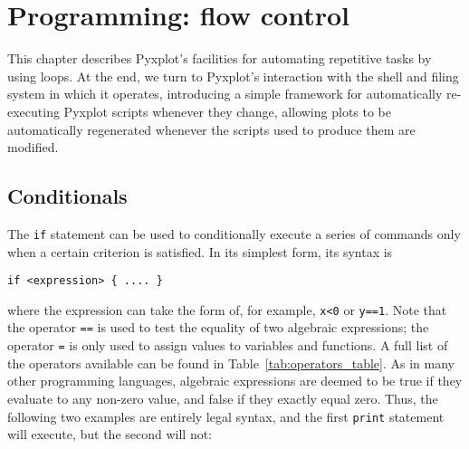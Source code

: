 %
%
%
%
%



\chapter{Programming: flow control}

This chapter describes Pyxplot's facilities for automating
repetitive tasks by using loops. At the end, we turn to Pyxplot's
interaction with the shell and filing system in which it operates, introducing
a simple framework for automatically re-executing Pyxplot scripts whenever they
change, allowing plots to be automatically regenerated whenever the scripts
used to produce them are modified.

\section{Conditionals}

The {\tt if} statement can be used to conditionally execute a series
of commands only when a certain criterion is satisfied. In its simplest form,
its syntax is

\begin{verbatim}
if <expression> { .... }
\end{verbatim}

\noindent where the expression can take the form of, for example, {\tt x<0} or
{\tt y==1}. Note that the operator {\tt ==} is used to test the equality of two
algebraic expressions; the operator {\tt =} is only used to assign values to
variables and functions. A full list of the operators available can be found in
Table~\ref{tab:operators_table}. As in many other programming languages,
algebraic expressions are deemed to be true if they evaluate to any non-zero
value, and false if they exactly equal zero. Thus, the following two examples
are entirely legal syntax, and the first {\tt print} statement will execute,
but the second will not:

